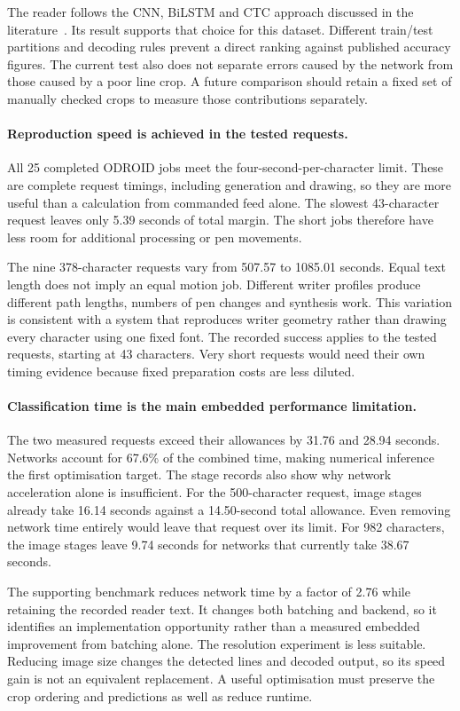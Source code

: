 The reader follows the CNN, BiLSTM and CTC approach discussed in the literature~\cite[pp.~4--5]{kizilirmak2023}. Its result supports that choice for this dataset. Different train/test partitions and decoding rules prevent a direct ranking against published accuracy figures. The current test also does not separate errors caused by the network from those caused by a poor line crop. A future comparison should retain a fixed set of manually checked crops to measure those contributions separately.

\paragraph{Reproduction speed is achieved in the tested requests.}
All 25 completed ODROID jobs meet the four-second-per-character limit. These are complete request timings, including generation and drawing, so they are more useful than a calculation from commanded feed alone. The slowest 43-character request leaves only 5.39 seconds of total margin. The short jobs therefore have less room for additional processing or pen movements.

The nine 378-character requests vary from 507.57 to 1085.01 seconds. Equal text length does not imply an equal motion job. Different writer profiles produce different path lengths, numbers of pen changes and synthesis work. This variation is consistent with a system that reproduces writer geometry rather than drawing every character using one fixed font. The recorded success applies to the tested requests, starting at 43 characters. Very short requests would need their own timing evidence because fixed preparation costs are less diluted.

\paragraph{Classification time is the main embedded performance limitation.}
The two measured requests exceed their allowances by 31.76 and 28.94 seconds. Networks account for 67.6\% of the combined time, making numerical inference the first optimisation target. The stage records also show why network acceleration alone is insufficient. For the 500-character request, image stages already take 16.14 seconds against a 14.50-second total allowance. Even removing network time entirely would leave that request over its limit. For 982 characters, the image stages leave 9.74 seconds for networks that currently take 38.67 seconds.

The supporting benchmark reduces network time by a factor of 2.76 while retaining the recorded reader text. It changes both batching and backend, so it identifies an implementation opportunity rather than a measured embedded improvement from batching alone. The resolution experiment is less suitable. Reducing image size changes the detected lines and decoded output, so its speed gain is not an equivalent replacement. A useful optimisation must preserve the crop ordering and predictions as well as reduce runtime.

